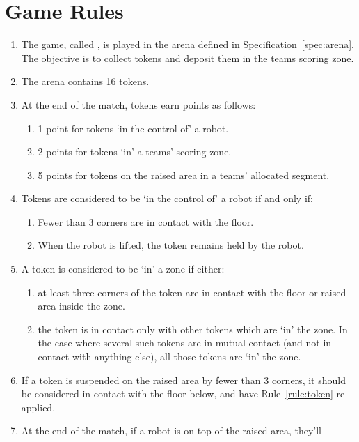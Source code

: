 \section{Game Rules}
\label{sec:rules}

\begin{enumerate}
  \item The game, called \emph{\gamename}, is played in the arena defined in
        Specification~\ref{spec:arena}. The objective is to collect tokens and
        deposit them in the teams scoring zone.
  \item The arena contains 16 tokens.
  \item At the end of the match, tokens earn points as follows:
    \begin{enumerate}
      \item 1 point for tokens `in the control of' a robot.
      \item 2 points for tokens `in' a teams' scoring zone.
      \item 5 points for tokens on the raised area in a teams' allocated segment.
    \end{enumerate}
  \item Tokens are considered to be `in the control of' a robot if and only if:
    \begin{enumerate}
      \item Fewer than 3 corners are in contact with the floor.
      \item When the robot is lifted, the token remains held by the robot.
    \end{enumerate}
  \item \label{rule:token} A token is considered to be `in' a zone if either:
    \begin{enumerate}
      \item at least three corners of the token are in contact with the floor or
            raised area inside the zone.
      \item the token is in contact only with other tokens which are `in' the zone.
            In the case where several such tokens are in mutual contact (and not in
            contact with anything else), all those tokens are `in' the zone.
    \end{enumerate}
  \item If a token is suspended on the raised area by fewer than 3 corners, it should be considered
        in contact with the floor below, and have Rule~\ref{rule:token} re-applied.
  \item At the end of the match, if a robot is on top of the raised area, they'll

\end{enumerate}
